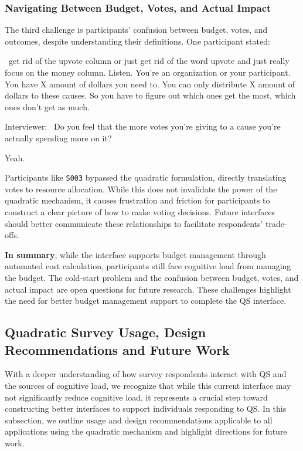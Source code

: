 
\subsubsection{Navigating Between Budget, Votes, and Actual Impact}
The third challenge is participants' confusion between budget, votes, and outcomes, despite understanding their definitions. One participant stated:

\begin{displayquote}

~\bracketellipsis get rid of the upvote column or just get rid of the word upvote and just really focus on the money column. Listen. You're an organization or your participant. You have X amount of dollars you need to. You can only distribute X amount of dollars to these causes. So you have to figure out which ones get the most, which ones don't get as much.~\bracketellipsis 

Interviewer: ~\bracketellipsis Do you feel that the more votes you're giving to a cause you're actually spending more on it?

Yeah. \hfill{}
\end{displayquote}
Participants like \texttt{S003} bypassed the quadratic formulation, directly translating votes to resource allocation. While this does not invalidate the power of the quadratic mechanism, it causes frustration and friction for participants to construct a clear picture of how to make voting decisions. Future interfaces should better communicate these relationships to facilitate respondents' trade-offs.

\textbf{In summary}, while the interface supports budget management through automated cost calculation, participants still face cognitive load from managing the budget. The cold-start problem and the confusion between budget, votes, and actual impact are open questions for future research. These challenges highlight the need for better budget management support to complete the QS interface.

\subsection{Quadratic Survey Usage, Design Recommendations and Future Work}
With a deeper understanding of how survey respondents interact with QS and the sources of cognitive load, we recognize that while this current interface may not significantly reduce cognitive load, it represents a crucial step toward constructing better interfaces to support individuals responding to QS. In this subsection, we outline usage and design recommendations applicable to all applications using the quadratic mechanism and highlight directions for future work.

